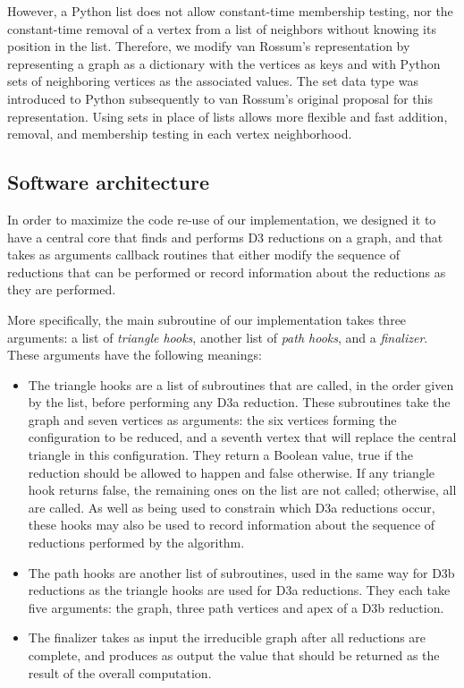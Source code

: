 \documentclass{article}
\begin{document}
However, a Python list does not allow constant-time membership testing, nor the constant-time removal of a vertex from a list of neighbors without knowing its position in the list. Therefore, we modify van Rossum's representation by
representing a graph as a dictionary with the vertices as keys and with Python sets of neighboring vertices as the associated values. The set data type was introduced to Python subsequently to van Rossum's original proposal for this representation. Using sets in place of lists allows more flexible and fast addition, removal, and membership testing in each vertex neighborhood.

\subsection{Software architecture}

In order to maximize the code re-use of our implementation, we designed it to have a central core that finds and performs D3 reductions on a graph, and that takes as arguments callback routines that either modify the sequence of reductions that can be performed or record information about the reductions as they are performed.

More specifically, the main subroutine of our implementation takes three arguments: a list of \emph{triangle hooks}, another list of \emph{path hooks}, and a \emph{finalizer}. These arguments have the following meanings:

\begin{itemize}
\item The triangle hooks are a list of subroutines that are called, in the order given by the list, before performing any D3a reduction. These subroutines take the graph and seven vertices as arguments: the six vertices forming the configuration to be reduced, and a seventh vertex that will replace the central triangle in this configuration. They return a Boolean value, true if the reduction should be allowed to happen and false otherwise. If any triangle hook returns false, the remaining ones on the list are not called; otherwise, all are called. As well as being used to constrain which D3a reductions occur, these hooks may also be used to record information about the sequence of reductions performed by the algorithm.
\item The path hooks are another list of subroutines, used in the same way for D3b reductions as the triangle hooks are used for D3a reductions. They each take five arguments: the graph, three path vertices and apex of a D3b reduction.
\item The finalizer takes as input the irreducible graph after all reductions are complete, and produces as output the value that should be returned as the result of the overall computation.
\end{itemize}
\end{document}
